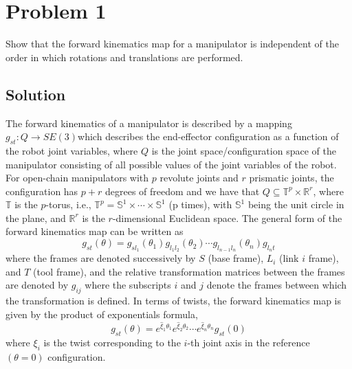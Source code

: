 \section*{Problem 1}
\setcounter{section}{1}
\setcounter{equation}{0}

Show that the forward kinematics map for a manipulator is independent of the order in which rotations and translations are performed.

\subsection*{Solution}

The forward kinematics of a manipulator is described by a mapping \( g_{st} : Q \to SE (3) \)which describes the end-eﬀector configuration as a function of the robot joint variables, where \( Q \) is the joint space/configuration space of the manipulator consisting of all possible values of the joint variables of the robot.
For open-chain manipulators with \( p \) revolute joints and \( r \) prismatic joints, the configuration has \( p+r \) degrees of freedom and we have that \( Q \subseteq \mathbb{T}^{p} \times \mathbb{R}^{r} \), where \( \mathbb{T} \) is the \(p\)-torus, i.e., \( \mathbb{T}^{p} = \mathbb{S}^{1} \times \cdots \times \mathbb{S}^{1} \) (p times), with \( \mathbb{S}^{1} \) being the unit circle in the plane, and \( \mathbb{R}^{r} \) is the \(r\)-dimensional Euclidean space.
The general form of the forward kinematics map can be written as
\begin{equation}
    g_{st}(\theta)
    =
    g_{s l_1}(\theta_1)
    g_{l_1 l_2}(\theta_2)
    \cdots
    g_{l_{n-1} l_n}(\theta_n)
    g_{l_n t}
\end{equation}
where the frames are denoted successively by \( S \) (base frame), \( L_i \) (link \(i\) frame), and \( T \) (tool frame), and the relative transformation matrices between the frames are denoted by \( g_{ij} \) where the subscripts \( i \) and \( j \) denote the frames between which the transformation is defined.
In terms of twists, the forward kinematics map is given by the product of exponentials formula,
\begin{equation}
    g_{st}(\theta)
    =
    e^{\widehat{\xi}_1 \theta_1}
    e^{\widehat{\xi}_2 \theta_2}
    \cdots
    e^{\widehat{\xi}_n \theta_n}
    g_{st}(0)
\end{equation}
where \( \xi_{i} \) is the twist corresponding to the \(i\)-th joint axis in the reference \( (\theta = 0) \) conﬁguration.
